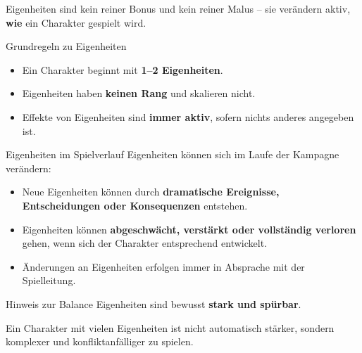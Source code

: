 Eigenheiten sind kein reiner Bonus und kein reiner Malus – sie verändern aktiv,
\textbf{wie} ein Charakter gespielt wird.

\medskip

\begin{rulebox}{Grundregeln zu Eigenheiten}
	\begin{itemize}
		\item Ein Charakter beginnt mit \textbf{1–2 Eigenheiten}.
		\item Eigenheiten haben \textbf{keinen Rang} und skalieren nicht.
		\item Effekte von Eigenheiten sind \textbf{immer aktiv}, sofern nichts anderes
		angegeben ist.
	\end{itemize}
\end{rulebox}

\medskip

\begin{rulebox}{Eigenheiten im Spielverlauf}
	Eigenheiten können sich im Laufe der Kampagne verändern:
	\begin{itemize}
		\item Neue Eigenheiten können durch
		\textbf{dramatische Ereignisse, Entscheidungen oder Konsequenzen}
		entstehen.
		\item Eigenheiten können \textbf{abgeschwächt, verstärkt oder vollständig verloren}
		gehen, wenn sich der Charakter entsprechend entwickelt.
		\item Änderungen an Eigenheiten erfolgen immer in Absprache mit der Spielleitung.
	\end{itemize}
\end{rulebox}

\medskip

\begin{rulebox}{Hinweis zur Balance}
	Eigenheiten sind bewusst \textbf{stark und spürbar}.
	
	Ein Charakter mit vielen Eigenheiten ist nicht automatisch stärker,
	sondern komplexer und konfliktanfälliger zu spielen.
\end{rulebox}



